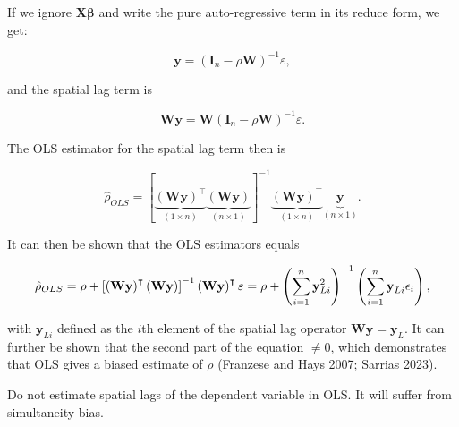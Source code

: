 \documentclass[
  letterpaper,
]{scrbook}
\begin{document}
If we ignore \({\boldsymbol{\mathbf{X}}}{\boldsymbol{\mathbf{\beta}}}\)
and write the pure auto-regressive term in its reduce form, we get:

\[
\boldsymbol{\mathbf{y}} =\left(\boldsymbol{\mathbf{I}}_n - \rho\boldsymbol{\mathbf{W}}\right)^{-1}\varepsilon,
\]

and the spatial lag term is

\[
\boldsymbol{\mathbf{W}} \boldsymbol{\mathbf{y}} =\boldsymbol{\mathbf{W}}\left(\boldsymbol{\mathbf{I}}_n - \rho\boldsymbol{\mathbf{W}}\right)^{-1}\varepsilon.
\]

The OLS estimator for the spatial lag term then is

\[
\hat{\rho}_{OLS} = \left[\underbrace{\left(\boldsymbol{\mathbf{W}}\boldsymbol{\mathbf{y}} \right)^\intercal}_{(1\times n)}\underbrace{\left(\boldsymbol{\mathbf{W}}\boldsymbol{\mathbf{y}} \right)}_{(n\times 1)}\right]^{-1}\underbrace{\left(\boldsymbol{\mathbf{W}}\boldsymbol{\mathbf{y}} \right)^\intercal}_{(1\times n)}\underbrace{\boldsymbol{\mathbf{y}}}_{(n\times 1)}.
\]

It can then be shown that the OLS estimators equals

\[
          \hat{\rho}_{OLS} = \rho + \left[\left(\boldsymbol{\mathbf{W}}\boldsymbol{\mathbf{y}} \right)^\intercal\left(\boldsymbol{\mathbf{W}}\boldsymbol{\mathbf{y}} \right)\right]^{-1}\left(\boldsymbol{\mathbf{W}}\boldsymbol{\mathbf{y}} \right)^\intercal\varepsilon \\
                                = \rho + \left(\sum_{i = 1}^n \boldsymbol{\mathbf{y}}_{Li}^2\right)^{-1}\left(\sum_{i = 1}^{n}\boldsymbol{\mathbf{y}}_{Li}\epsilon_i\right),
\]

with \(\boldsymbol{\mathbf{y}}_{Li}\) defined as the \(i\)th element of
the spatial lag operator
\(\boldsymbol{\mathbf{W}}\boldsymbol{\mathbf{y}} = \boldsymbol{\mathbf{y}}_L\).
It can further be shown that the second part of the equation \(\neq 0\),
which demonstrates that OLS gives a biased estimate of \(\rho\)
(Franzese and Hays 2007; Sarrias 2023).

\begin{tcolorbox}[enhanced jigsaw, colframe=quarto-callout-warning-color-frame, coltitle=black, titlerule=0mm, opacitybacktitle=0.6, toprule=.15mm, colbacktitle=quarto-callout-warning-color!10!white, toptitle=1mm, leftrule=.75mm, colback=white, bottomtitle=1mm, opacityback=0, left=2mm, title=\textcolor{quarto-callout-warning-color}{\faExclamationTriangle}\hspace{0.5em}{Warning}, breakable, arc=.35mm, rightrule=.15mm, bottomrule=.15mm]

Do not estimate spatial lags of the dependent variable in OLS. It will
suffer from simultaneity bias.

\end{tcolorbox}
\end{document}
